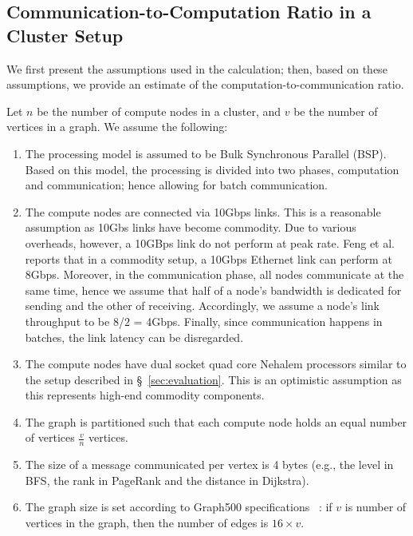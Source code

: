 \subsection{Communication-to-Computation Ratio in a Cluster Setup}
\label{sec:model}
We first present the assumptions used in the calculation; then, based on these assumptions, we provide an estimate of the computation-to-communication ratio. 

Let $n$ be the number of compute nodes in a cluster, and $v$ be the number of vertices in a graph. We assume the following: 

\begin{enumerate}
\item The processing model is assumed to be Bulk Synchronous Parallel (BSP). Based on this model, the processing is divided into two phases, computation and communication; hence allowing for batch communication.

\item The compute nodes are connected via 10Gbps links. This is a reasonable assumption as 10Gbs links have become commodity. Due to various overheads, however, a 10GBps link do not perform at peak rate. Feng et al. \cite{Feng2003} reports that in a commodity setup, a 10Gbps Ethernet link can perform at 8Gbps. Moreover, in the communication phase, all nodes communicate at the same time, hence we assume that half of a node's bandwidth is dedicated for sending and the other of receiving. Accordingly, we assume a node's link throughput to be 8/2 = 4Gbps. Finally, since communication happens in batches, the link latency can be disregarded.

\item The compute nodes have dual socket quad core Nehalem processors similar to the setup described in \S~\ref{sec:evaluation}. This is an optimistic assumption as this represents high-end commodity components.

\item The graph is partitioned such that each compute node holds an equal number of vertices $\frac{v}{n}$ vertices.

\item The size of a message communicated per vertex is 4 bytes (e.g., the level in BFS, the rank in PageRank and the distance in Dijkstra).

\item The graph size is set according to Graph500 specifications ~\cite{graph500}: if $v$ is number of vertices in the graph, then the number of edges is $16 \times v$.


\end{enumerate}
